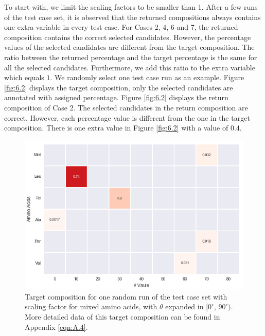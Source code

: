 To start with, we limit the scaling factors to be smaller than 1. After a few runs of the test case set, it is observed that the returned compositions always contains one extra variable in every test case. For Cases 2, 4, 6 and 7, the returned composition contains the correct selected candidates. However, the percentage values of the selected candidates are different from the target composition. The ratio between the returned percentage and the target percentage is the same for all the selected candidates. Furthermore, we add this ratio to the extra variable which equals $1$. We randomly select one test case run as an example. Figure \ref{fig:6.2} displays the target composition, only the selected candidates are annotated with assigned percentage. Figure \ref{fig:6.2} displays the return composition of Case 2. The selected candidates in the return composition are correct. However, each percentage value is different from the one in the target composition. There is one extra value in Figure \ref{fig:6.2} with a value of $0.4$. \\

\begin{figure}[!ht] 
\centering
\includegraphics[scale=0.9]{Figures/chapter6_figure_one.png}
\caption{Target composition for one random run of the test case set with scaling factor for mixed amino acids, with $\theta$ expanded in $[0^{\circ}$, $90^{\circ})$. More detailed data of this target composition can be found in Appendix \ref{eqn:A.4}.} \label{fig:6.1}
\end{figure}

